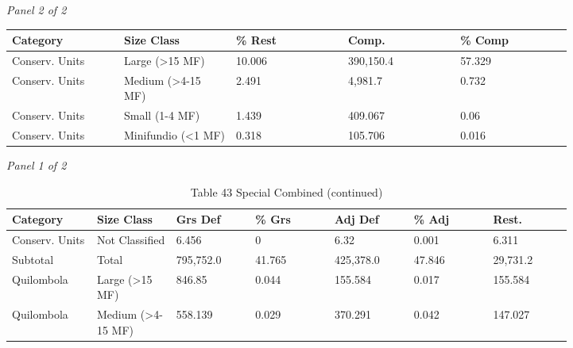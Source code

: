 \documentclass[12pt]{article}
\begin{document}
\begin{landscape}
\begin{table}[H]
\textit{Panel 2 of 2}\\[2pt]
{\fontsize{12}{14}\selectfont
\setlength{\tabcolsep}{3pt}
\renewcommand{\arraystretch}{1.08}
\begin{tabular}{p{0.164\linewidth}p{0.164\linewidth}p{0.164\linewidth}p{0.164\linewidth}p{0.164\linewidth}}
\toprule
Category & Size Class & \% Rest & Comp. & \% Comp \\
\midrule
Conserv. Units & Large (>15 MF) & 10.006 & 390,150.4 & 57.329 \\
Conserv. Units & Medium (>4-15 MF) & 2.491 & 4,981.7 & 0.732 \\
Conserv. Units & Small (1-4 MF) & 1.439 & 409.067 & 0.06 \\
Conserv. Units & Minifundio (<1 MF) & 0.318 & 105.706 & 0.016 \\
\bottomrule
\end{tabular}
}
\end{table}
\begin{table}[H]
\centering
\caption{Table 43 Special Combined (continued)}
\textit{Panel 1 of 2}\\[2pt]
{\fontsize{12}{14}\selectfont
\setlength{\tabcolsep}{3pt}
\renewcommand{\arraystretch}{1.08}
\begin{tabular}{p{0.117\linewidth}p{0.117\linewidth}p{0.117\linewidth}p{0.117\linewidth}p{0.117\linewidth}p{0.117\linewidth}p{0.117\linewidth}}
\toprule
Category & Size Class & Grs Def & \% Grs & Adj Def & \% Adj & Rest. \\
\midrule
Conserv. Units & Not Classified & 6.456 & 0 & 6.32 & 0.001 & 6.311 \\
Subtotal & Total & 795,752.0 & 41.765 & 425,378.0 & 47.846 & 29,731.2 \\
Quilombola & Large (>15 MF) & 846.85 & 0.044 & 155.584 & 0.017 & 155.584 \\
Quilombola & Medium (>4-15 MF) & 558.139 & 0.029 & 370.291 & 0.042 & 147.027 \\
\bottomrule
\end{tabular}
}

\vspace{0.6em}


\end{table}
\end{landscape}
\end{document}
